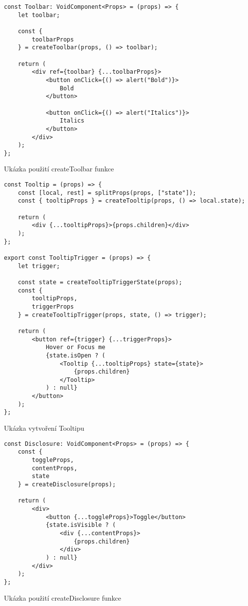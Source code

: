 \begin{listing}
    \begin{verbatim}
const Toolbar: VoidComponent<Props> = (props) => {
    let toolbar;

    const {
        toolbarProps
    } = createToolbar(props, () => toolbar);

    return (
        <div ref={toolbar} {...toolbarProps}>
            <button onClick={() => alert("Bold")}>
                Bold
            </button>

            <button onClick={() => alert("Italics")}>
                Italics
            </button>
        </div>
    );
};
\end{verbatim}
    \caption{Ukázka použití createToolbar funkce}
    \label{toolbar-example}
\end{listing}

\begin{listing}
    \begin{verbatim}
const Tooltip = (props) => {
    const [local, rest] = splitProps(props, ["state"]);
    const { tooltipProps } = createTooltip(props, () => local.state);
    
    return (
        <div {...tooltipProps}>{props.children}</div>
    );
};

export const TooltipTrigger = (props) => {
    let trigger;
    
    const state = createTooltipTriggerState(props);
    const {
        tooltipProps,
        triggerProps
    } = createTooltipTrigger(props, state, () => trigger);
    
    return (
        <button ref={trigger} {...triggerProps}>
            Hover or Focus me
            {state.isOpen ? (
                <Tooltip {...tooltipProps} state={state}>
                    {props.children}
                </Tooltip>
            ) : null}
        </button>
    );
};
\end{verbatim}
    \caption{Ukázka vytvoření Tooltipu}
    \label{tooltip-example}
\end{listing}

\begin{listing}
    \begin{verbatim}
const Disclosure: VoidComponent<Props> = (props) => {
    const {
        toggleProps,
        contentProps,
        state
    } = createDisclosure(props);

    return (
        <div>
            <button {...toggleProps}>Toggle</button>
            {state.isVisible ? (
                <div {...contentProps}>
                    {props.children}
                </div>
            ) : null}
        </div>
    );
};
\end{verbatim}
    \caption{Ukázka použití createDisclosure funkce}
    \label{disclosure-example}
\end{listing}

